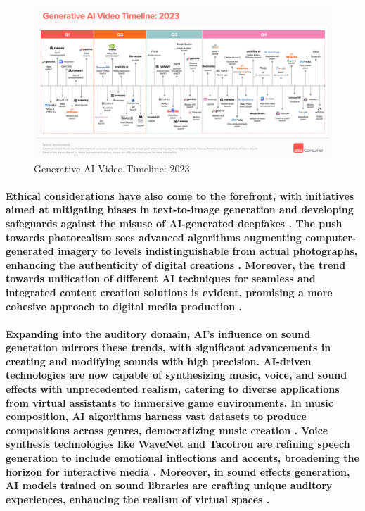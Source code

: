 \documentclass[11pt,a4paper,oneside]{report}
\begin{document}
\begin{figure}[htbp]
  \centering
  \includegraphics[width=\textwidth]{timeline.png}
  \caption{Generative AI Video Timeline: 2023 \cite{a16zAI2023}}
  \label{fig:1}
\end{figure}

\paragraph{Ethical considerations have also come to the forefront, with initiatives aimed at mitigating biases in text-to-image generation and developing safeguards against the misuse of AI-generated deepfakes \cite{esposito2023mitigating}. The push towards photorealism sees advanced algorithms augmenting computer-generated imagery to levels indistinguishable from actual photographs, enhancing the authenticity of digital creations \cite{richter2022enhancing}. Moreover, the trend towards unification of different AI techniques for seamless and integrated content creation solutions is evident, promising a more cohesive approach to digital media production \cite{esser2022towards}.}

\paragraph{Expanding into the auditory domain, AI's influence on sound generation mirrors these trends, with significant advancements in creating and modifying sounds with high precision. AI-driven technologies are now capable of synthesizing music, voice, and sound effects with unprecedented realism, catering to diverse applications from virtual assistants to immersive game environments. In music composition, AI algorithms harness vast datasets to produce compositions across genres, democratizing music creation \cite{briot2021artificial}. Voice synthesis technologies like WaveNet and Tacotron are refining speech generation to include emotional inflections and accents, broadening the horizon for interactive media \cite{oord2016wavenet}. Moreover, in sound effects generation, AI models trained on sound libraries are crafting unique auditory experiences, enhancing the realism of virtual spaces \cite{greshler2021catch}.}
\end{document}
